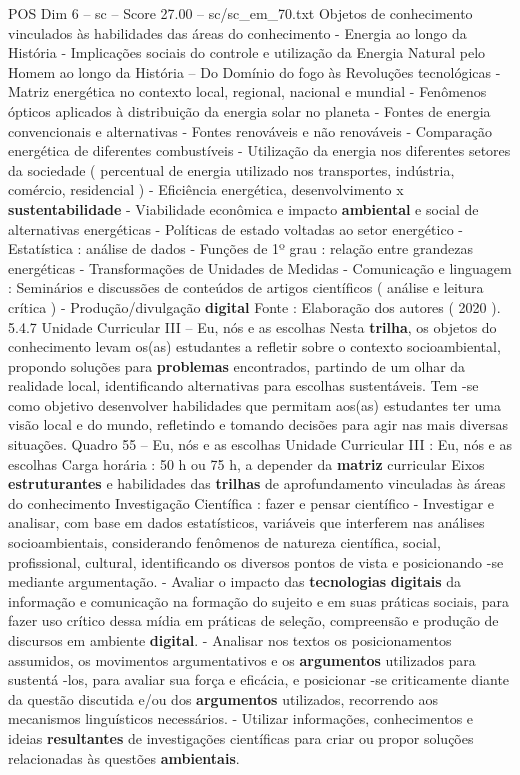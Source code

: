 \begin{textsample}{POS Dim 6 – sc – Score 27.00 – sc/sc\_em\_70.txt}
Objetos de conhecimento vinculados às habilidades das áreas do conhecimento - Energia ao longo da História - Implicações sociais do controle e utilização da Energia Natural pelo Homem ao longo da História – Do Domínio do fogo às Revoluções tecnológicas - Matriz energética no contexto local, regional, nacional e mundial - Fenômenos ópticos aplicados à distribuição da energia solar no planeta - Fontes de energia convencionais e alternativas - Fontes renováveis e não renováveis - Comparação energética de diferentes combustíveis - Utilização da energia nos diferentes setores da sociedade ( percentual de energia utilizado nos transportes, indústria, comércio, residencial ) - Eficiência energética, desenvolvimento x \textbf{sustentabilidade} - Viabilidade econômica e impacto \textbf{ambiental} e social de alternativas energéticas - Políticas de estado voltadas ao setor energético - Estatística : análise de dados - Funções de 1º grau : relação entre grandezas energéticas - Transformações de Unidades de Medidas - Comunicação e linguagem : Seminários e discussões de conteúdos de artigos científicos ( análise e leitura crítica ) - Produção/divulgação \textbf{digital} Fonte : Elaboração dos autores ( 2020 ). 5.4.7 Unidade Curricular III – Eu, nós e as escolhas Nesta \textbf{trilha}, os objetos do conhecimento levam os(as) estudantes a refletir sobre o contexto socioambiental, propondo soluções para \textbf{problemas} encontrados, partindo de um olhar da realidade local, identificando alternativas para escolhas sustentáveis.
Tem -se como objetivo desenvolver habilidades que permitam aos(as) estudantes ter uma visão local e do mundo, refletindo e tomando decisões para agir nas mais diversas situações.
Quadro 55 – Eu, nós e as escolhas Unidade Curricular III : Eu, nós e as escolhas Carga horária : 50 h ou 75 h, a depender da \textbf{matriz} curricular Eixos \textbf{estruturantes} e habilidades das \textbf{trilhas} de aprofundamento vinculadas às áreas do conhecimento Investigação Científica : fazer e pensar científico - Investigar e analisar, com base em dados estatísticos, variáveis que interferem nas análises socioambientais, considerando fenômenos de natureza científica, social, profissional, cultural, identificando os diversos pontos de vista e posicionando -se mediante argumentação. - Avaliar o impacto das \textbf{tecnologias} \textbf{digitais} da informação e comunicação na formação do sujeito e em suas práticas sociais, para fazer uso crítico dessa mídia em práticas de seleção, compreensão e produção de discursos em ambiente \textbf{digital}. - Analisar nos textos os posicionamentos assumidos, os movimentos argumentativos e os \textbf{argumentos} utilizados para sustentá -los, para avaliar sua força e eficácia, e posicionar -se criticamente diante da questão discutida e/ou dos \textbf{argumentos} utilizados, recorrendo aos mecanismos linguísticos necessários. - Utilizar informações, conhecimentos e ideias \textbf{resultantes} de investigações científicas para criar ou propor soluções relacionadas às questões \textbf{ambientais}.

\end{textsample}
